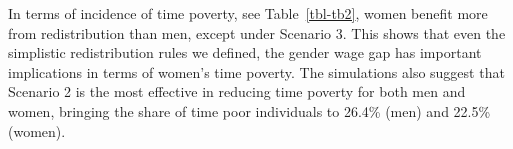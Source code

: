 \documentclass[
  11pt,
]{article}
\begin{document}
\begin{table}

\caption{\label{tbl-tb2}Time Poverty and Transition Rates}


\end{table}%

In terms of incidence of time poverty, see Table~\ref{tbl-tb2}, women
benefit more from redistribution than men, except under Scenario 3. This
shows that even the simplistic redistribution rules we defined, the
gender wage gap has important implications in terms of women's time
poverty. The simulations also suggest that Scenario 2 is the most
effective in reducing time poverty for both men and women, bringing the
share of time poor individuals to 26.4\% (men) and 22.5\%(women).
\end{document}
